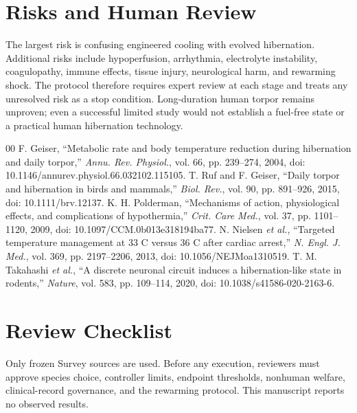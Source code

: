 \documentclass[conference]{IEEEtran}
\begin{document}
\section{Risks and Human Review}
The largest risk is confusing engineered cooling with evolved hibernation. Additional risks include hypoperfusion, arrhythmia, electrolyte instability, coagulopathy, immune effects, tissue injury, neurological harm, and rewarming shock. The protocol therefore requires expert review at each stage and treats any unresolved risk as a stop condition. Long-duration human torpor remains unproven; even a successful limited study would not establish a fuel-free state or a practical human hibernation technology.
\begin{thebibliography}{00}
 F. Geiser, ``Metabolic rate and body temperature reduction during hibernation and daily torpor,'' \emph{Annu. Rev. Physiol.}, vol. 66, pp. 239--274, 2004, doi: 10.1146/annurev.physiol.66.032102.115105.
 T. Ruf and F. Geiser, ``Daily torpor and hibernation in birds and mammals,'' \emph{Biol. Rev.}, vol. 90, pp. 891--926, 2015, doi: 10.1111/brv.12137.
 K. H. Polderman, ``Mechanisms of action, physiological effects, and complications of hypothermia,'' \emph{Crit. Care Med.}, vol. 37, pp. 1101--1120, 2009, doi: 10.1097/CCM.0b013e318194ba77.
 N. Nielsen \emph{et al.}, ``Targeted temperature management at 33 C versus 36 C after cardiac arrest,'' \emph{N. Engl. J. Med.}, vol. 369, pp. 2197--2206, 2013, doi: 10.1056/NEJMoa1310519.
 T. M. Takahashi \emph{et al.}, ``A discrete neuronal circuit induces a hibernation-like state in rodents,'' \emph{Nature}, vol. 583, pp. 109--114, 2020, doi: 10.1038/s41586-020-2163-6.
\end{thebibliography}
\appendix
\section{Review Checklist}Only frozen Survey sources are used. Before any execution, reviewers must approve species choice, controller limits, endpoint thresholds, nonhuman welfare, clinical-record governance, and the rewarming protocol. This manuscript reports no observed results.
\end{document}
